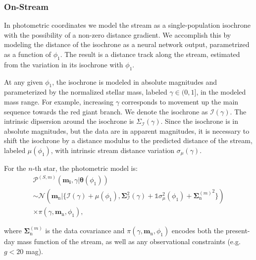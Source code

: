 \documentclass[twocolumn]{aastex631}
\newcommand{\mrm}[1]{\mathrm{#1}}
\newcommand{\mbs}[1]{\boldsymbol{#1}}
\newcommand{\mcal}[1]{\mathcal{#1}}
\newcommand{\pdf}{\mcal{P}}
\newcommand{\prior}{\mcal{\pi}}
\newcommand{\nth}[1]{{#1}_{\mrm{n}}}  %
\newcommand{\smallcomponent}[2]{#2^{\scriptscriptstyle (#1)}}
\newcommand{\cmp}[2]{\smallcomponent{#1}{#2}}
\begin{document}
        \subsubsection{On-Stream} \label{ssub:method:photometric_model:on_stream}

            In photometric coordinates we model the stream as a
            single-population isochrone with the possibility of a non-zero
            distance gradient. We accomplish this by modeling the distance of
            the isochrone as a neural network output, parametrized as a function
            of $\phi_1$. The result is a distance track along the stream,
            estimated from the variation in its isochrone with $\phi_1$. 
            
            At any given $\phi_1$, the isochrone is modeled in absolute
            magnitudes and parameterized by the normalized stellar mass, labeled
            $\gamma \in (0, 1]$, in the modeled mass range. For example,
            increasing $\gamma$ corresponds to movement up the main sequence
            towards the red giant branch. We denote the isochrone as
            $\mcal{I(\gamma)}$. The intrinsic dipsersion around the isochrone is
            $\Sigma_\mcal{I}(\gamma)$. Since the isochrone is in absolute
            magnitudes, but the data are in apparent magnitudes, it is necessary
            to shift the isochrone by a distance modulus to the predicted
            distance of the stream, labeled  $\mu(\phi_1)$, with intrinsic
            stream distance variation $\sigma_\mu(\gamma)$.
            
            For the $n$-th star, the photometric model is:
            \begin{multline} \label{eq:photometric_probability_point}
                \cmp{S,m}{\pdf}(\mbs{m_i}, \gamma | \mbs{\theta}(\phi_1)) 
                \\ \sim \mcal{N}(\nth{\mbs{m}} | \{\mcal{I(\gamma)} + \mu(\phi_1), \mbs{\Sigma}_{\mcal{I}}^2(\gamma) + \mathds{1} \sigma_\mu^2(\phi_1) + {\cmp{m}{\nth{\mbs{\Sigma}}}}^2 \}) \\ \times \prior(\gamma, \nth{\mbs{m}}, \phi_1),
            \end{multline}
    
            where $\cmp{m}{\nth{\mbs{\Sigma}}}$ is the data covariance and
            $\prior(\gamma, \nth{\mbs{m}}, \phi_1)$ encodes both the present-day
            mass function of the stream, as well as any observational
            constraints (e.g. $g < 20$ mag).
    
\end{document}
